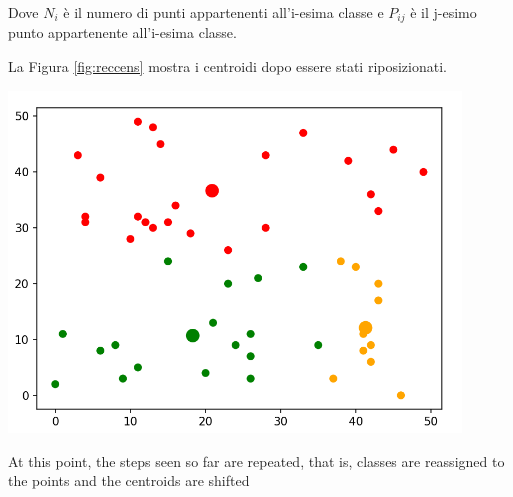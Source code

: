 \documentclass{report}
\begin{document}
\begin{minipage}[b]{0.48\textwidth}
  Dove $N_i$ è il numero di punti appartenenti all'i-esima classe e $P_{ij}$ è il j-esimo punto appartenente all'i-esima classe. 

  La Figura \ref{fig:reccens} mostra i centroidi dopo essere stati riposizionati. 
  
  \begin{center}    
      \includegraphics[width = 0.9\textwidth]{imgs/reccens.png}
      \label{fig:reccens}
  \end{center}

  At this point, the steps seen so far are repeated, that is, classes are reassigned to the points and the centroids are shifted 
\end{minipage}

\newpage
\end{document}
